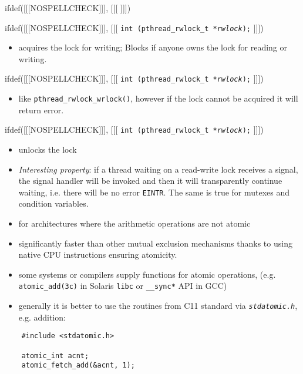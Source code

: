 
ifdef([[[NOSPELLCHECK]]], [[[
]]])

\begin{slide}
\prgchars
ifdef([[[NOSPELLCHECK]]], [[[
\texttt{int (pthread\_rwlock\_t *\emph{rwlock});}
]]])
\begin{itemize}
\item acquires the lock for writing; Blocks if anyone owns the lock for reading
or writing.
\end{itemize}
ifdef([[[NOSPELLCHECK]]], [[[
\texttt{int (pthread\_rwlock\_t *\emph{rwlock});}
]]])
\begin{itemize}
\item like \texttt{pthread\_rwlock\_wrlock()}, however if the lock cannot be
acquired it will return error.
\end{itemize}
ifdef([[[NOSPELLCHECK]]], [[[
\texttt{int (pthread\_rwlock\_t *\emph{rwlock});}
]]])
\begin{itemize}
\item unlocks the lock
\end{itemize}
\end{slide}

\begin{itemize}
\item \emph{Interesting property}: if a thread waiting on a read-write lock
receives a signal, the signal handler will be invoked and then it will
transparently continue waiting, i.e. there will be no error \texttt{EINTR}.
The same is true for mutexes and condition variables.
\end{itemize}



\begin{slide}
\begin{itemize}
\item for architectures where the arithmetic operations are not atomic
\item significantly faster than other mutual exclusion mechanisms
thanks to using native CPU instructions ensuring atomicity.
\item some systems or compilers supply functions for atomic operations,
(e.g. \texttt{atomic\_add(3c)} in Solaris \texttt{libc} or
\texttt{\_\_sync*} API in GCC)
\item generally it is better to use the routines from C11 standard
via \emph{\texttt{stdatomic.h}}, e.g. addition:
\end{itemize}
\begin{verbatim}
    #include <stdatomic.h>

    atomic_int acnt;
    atomic_fetch_add(&acnt, 1);
\end{verbatim}
\end{slide}

